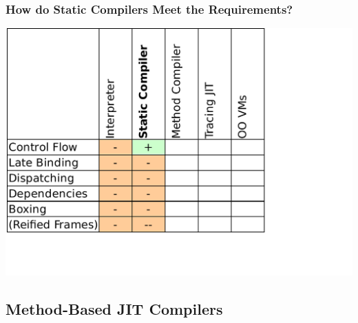 \documentclass[utf8x]{beamer}
\begin{document}
\begin{frame}
  \frametitle{How do Static Compilers Meet the Requirements?}
  \includegraphics[scale=0.6]{figures/output2.pdf}
\end{frame}


\subsection{Method-Based JIT Compilers}
\end{document}
